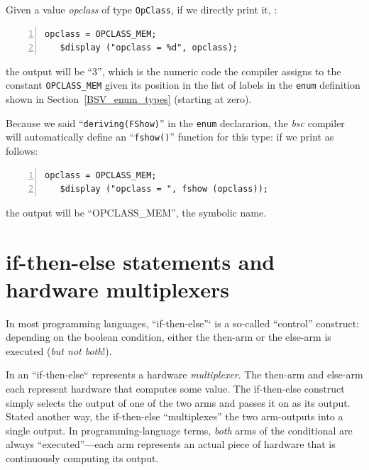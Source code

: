 \label{Sec_deriving_FShow}


Given a value \emph{opclass} of type \verb|OpClass|, if we directly
print it, {\eg}:

{\footnotesize
\begin{Verbatim}[frame=single, numbers=left]
   opclass = OPCLASS_MEM;
   $display ("opclass = %d", opclass);
\end{Verbatim}
}

the output will be ``3'', which is the numeric code the compiler
assigns to the constant \verb|OPCLASS_MEM| given its position in the
list of labels in the \verb|enum| definition shown in
Section~\ref{BSV_enum_types} (starting at zero).

Because we said ``\verb|deriving(FShow)|'' in the \verb|enum|
declararion, the \emph{bsc} compiler will automatically define an
``\verb|fshow()|'' function for this type: if we print as follows:

{\footnotesize
\begin{Verbatim}[frame=single, numbers=left]
   opclass = OPCLASS_MEM;
   $display ("opclass = ", fshow (opclass));
\end{Verbatim}
}

the output will be ``OPCLASS\_MEM'', {\ie} the symbolic name.


\section{if-then-else statements and hardware multiplexers}

\label{BSV_Combo_Circuits_if_then_else}


In most programming languages, ``if-then-else''` is a so-called
``control'' construct: depending on the boolean condition, either the
then-arm or the else-arm is executed (\emph{but not both}!).

In {\BSV} an ``if-then-else`` represents a hardware \emph{multiplexer}.
The then-arm and else-arm each represent hardware that computes some
value.  The if-then-else construct simply selects the output of one of
the two arms and passes it on as its output.  Stated another way, the
if-then-else ``multiplexes'' the two arm-outputs into a single output.
In programming-language terms, \emph{both} arms of the conditional are
always ``executed''---each arm represents an actual piece of hardware
that is continuously computing its output.

